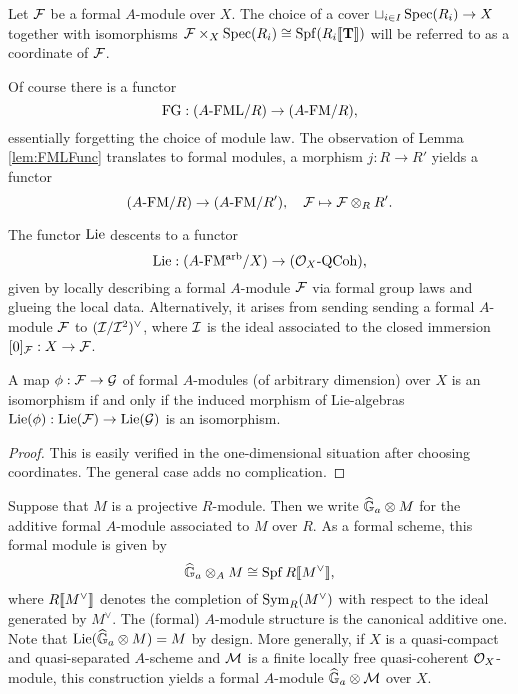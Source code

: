 \begin{defi}[Coordinate]
  Let $\mathcal{F}$ be a formal $A$-module over $X$. The choice of a cover $\sqcup_{i
  \in I} \operatorname{Spec}(R_i) \to X$ together with isomorphisms $\mathcal{F} \times_X \operatorname{Spec}(R_i)
  \cong \operatorname{Spf}(R_i\llbracket \mathbf{T} \rrbracket)$ will be referred to as a coordinate of $\mathcal{F}$. 
\end{defi}

Of course there is a functor 
\begin{equation*}
  \textnormal{FG}: {({A}\text-\mathrm{FML}/{R})} \to {({A}\text-\mathrm{FM}/{R})},
\end{equation*}
essentially forgetting the choice of module law. The observation of Lemma 
\ref{lem:FMLFunc} translates to formal modules, a morphism $j : R \to R'$ 
yields a functor 
\begin{equation*} 
  {({A}\text-\mathrm{FM}/{R})} \to {({A}\text-\mathrm{FM}/{R'})}, \quad \mathcal{F} \mapsto \mathcal{F} \otimes_R R'.
\end{equation*}

\begin{defi}
  The functor $\operatorname{Lie}$ descents to a functor 
  \begin{equation*}
    \operatorname{Lie}: {({A}\text-\mathrm{FM^{arb}}/{X})} \to {({\mathcal{O}_X}\text-\mathrm{QCoh})}, 
  \end{equation*}
  given by locally describing a formal $A$-module $\mathcal{F}$ via formal group laws
  and glueing the local data. Alternatively, it arises from sending 
  sending a formal $A$-module $\mathcal{F}$ to $(\mathcal{I} / \mathcal{I}^2)^\vee$, where $\mathcal{I}$ is the
  ideal associated to the closed immersion $[0]_{\mathcal{F}}: X \to \mathcal{F}$. 
\end{defi}

\begin{lem}\label{lem:IsosCheckOnLie}
  A map $\phi: \mathcal{F} \to \mathcal{G}$ of formal $A$-modules (of arbitrary dimension) over
  $X$ is an isomorphism if and only if the induced
  morphism of Lie-algebras $\operatorname{Lie}(\phi): \operatorname{Lie}(\mathcal{F}) \to \operatorname{Lie}(\mathcal{G})$ is an isomorphism.
\begin{proof}
  This is easily verified in the one-dimensional situation after choosing coordinates.
  The general case adds no complication. 
\end{proof}
\end{lem}

\begin{defi}
  \label{def:additiveformalmoduleassociatedtomodule}
  Suppose that $M$ is a projective $R$-module. Then we write
  $\widehat{\mathbb{G}}_a \otimes M$ for the additive formal $A$-module associated to $M$ over $R$.
  As a formal scheme, this formal module is given by
  \begin{equation*}
    \widehat{\mathbb{G}}_a \otimes_A M \cong \operatorname{Spf} R \llbracket M^\vee \rrbracket,
  \end{equation*}
  where $R \llbracket M^\vee \rrbracket$ denotes the completion of $\operatorname{Sym}_R(M^\vee)$ with respect
  to the ideal generated by $M^\vee$. The (formal) $A$-module structure is the
  canonical additive one. 
  Note that $\operatorname{Lie}(\widehat{\mathbb{G}}_a \otimes M) = M$ by design. 
  More generally, if $X$ is a quasi-compact and quasi-separated $A$-scheme
  and $\mathcal{M}$ is a finite locally free quasi-coherent 
  $\mathcal{O}_X$-module, this construction yields a formal $A$-module
  $\widehat{\mathbb{G}}_a \otimes \mathcal{M}$ over $X$.
\end{defi}

